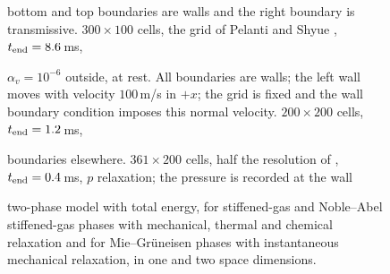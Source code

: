 \begin{figure}[p]
{%
bottom and top boundaries are walls and the right boundary is transmissive. $300\times100$ cells, the grid of Pelanti and Shyue \cite[Sec.~5.3]{PelantiShyue2014}, $t_{\rm end}=8.6$\,ms,

$\alpha_v=10^{-6}$ outside, at rest. All boundaries are walls; the left wall moves with velocity $100$\,m/s in $+x$; the grid
is fixed and the wall boundary condition imposes this normal velocity. $200\times200$ cells, $t_{\rm end}=1.2$\,ms,

boundaries elsewhere. $361\times200$ cells, half the resolution of \cite{Pelanti2022}, $t_{\rm end}=0.4$\,ms, $p$ relaxation; the pressure is recorded at the wall

two-phase model with total energy, for stiffened-gas and Noble--Abel stiffened-gas phases with mechanical, thermal and
chemical relaxation and for Mie--Gr\"uneisen phases with instantaneous mechanical relaxation, in one and two space dimensions.

}
\end{figure}
